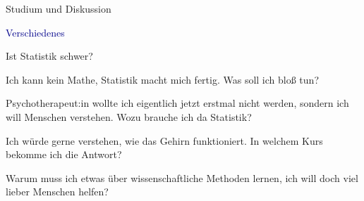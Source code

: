 \documentclass[
  8pt,
  ignorenonframetext,
]{beamer}
\begin{document}
\begin{frame}{Studium und Diskussion}
\protect\hypertarget{studium-und-diskussion-4}{}
\large

\textcolor{darkblue}{Verschiedenes} \vspace{2mm} \justifying \normalsize

Ist Statistik schwer? \vspace{1mm}

Ich kann kein Mathe, Statistik macht mich fertig. Was soll ich bloß tun?
\vspace{1mm}

Psychotherapeut:in wollte ich eigentlich jetzt erstmal nicht werden,
sondern ich will Menschen verstehen. Wozu brauche ich da Statistik?
\vspace{1mm}

Ich würde gerne verstehen, wie das Gehirn funktioniert. In welchem Kurs
bekomme ich die Antwort? \vspace{1mm}

Warum muss ich etwas über wissenschaftliche Methoden lernen, ich will
doch viel lieber Menschen helfen?
\end{frame}
\end{document}

